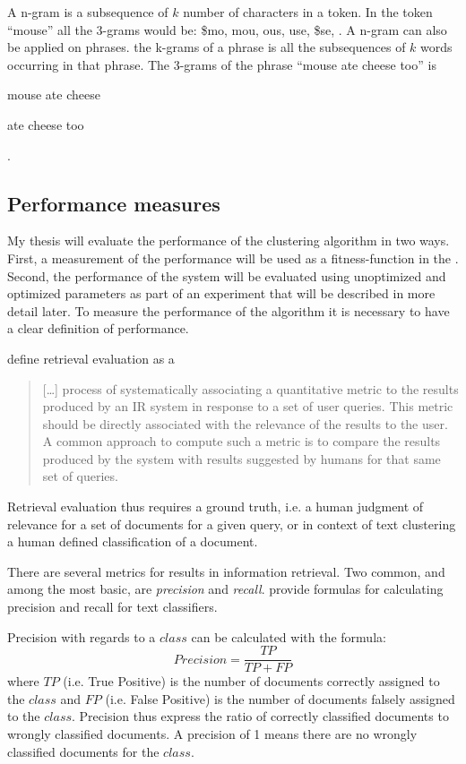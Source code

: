  A n-gram is a subsequence of \(k\) number of characters in a token. In the token ``mouse'' all the 3-grams would be: \$mo, mou, ous, use, \$se, \cite{Manning2009}. A n-gram can also be applied on phrases. the k-grams of a phrase is all the subsequences of \(k\) words occurring in that phrase. The 3-grams of the phrase ``mouse ate cheese too'' is
\begin{inparaenum}[(1)] 
    \item mouse ate cheese
    \item ate cheese too
\end{inparaenum}.

\subsection{Performance measures}
My thesis will evaluate the performance of the clustering algorithm in two ways. First, a measurement of the performance will be used as a fitness-function in the \GA. Second, the performance of the system will be evaluated using unoptimized and optimized parameters as part of an experiment that will be described in more detail later. To measure the performance of the \CTC algorithm it is necessary to have a clear definition of performance.

\cite[][131]{Baeza-Yates2011b} define retrieval evaluation as a \begin{quote} 
[\dots] process of systematically associating a quantitative metric to the results produced by an IR system in response to a set of user queries. This metric should be directly associated with the relevance of the results to the user. A common approach to compute such a metric is to compare the results produced by the system with results suggested by humans for that same set of queries.
\end{quote}
Retrieval evaluation thus requires a ground truth, i.e. a human judgment of relevance for a set of documents for a given query, or in context of text clustering a human defined classification of a document.

There are several metrics for results in information retrieval. Two common, and among the most basic, are \textit{precision} and \textit{recall}. \cite{Sebastiani2002,Baeza-Yates2011a} provide formulas for calculating precision and recall for text classifiers.

Precision with regards to a \(class\) can be calculated with the formula:
\begin{displaymath}
Precision = 
\frac{TP}{TP + FP}
\end{displaymath}
where \(TP\) (i.e. True Positive) is the number of documents correctly assigned to the \(class\) and \(FP\) (i.e. False Positive) is the number of documents falsely assigned to the \(class\). Precision thus express the ratio of correctly classified documents to wrongly classified documents. A precision of 1 means there are no wrongly classified documents for the \(class\).

